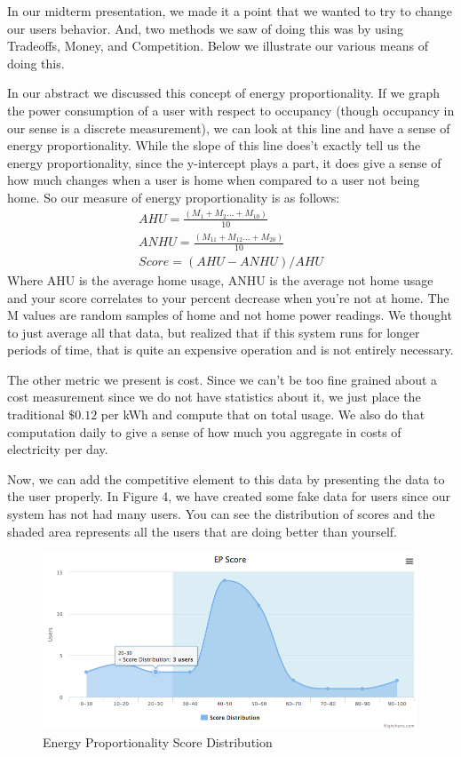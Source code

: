 \documentclass{sig-alternate-05-2015}
\begin{document}
In our midterm presentation, we made it a point that we wanted to try to change our users behavior. And, two methods we saw of doing this was by using Tradeoffs, Money, and Competition. Below we illustrate our various means of doing this.

In our abstract we discussed this concept of energy proportionality. If we graph the power consumption of a user with respect to occupancy (though occupancy in our sense is a discrete measurement), we can look at this line and have a sense of energy proportionality. While the slope of this line does't exactly tell us the energy proportionality, since the y-intercept plays a part, it does give a sense of how much changes when a user is home when compared to a user not being home. So our measure of energy proportionality is as follows:
\begin{equation*}
\begin{split}
AHU = \frac{(M_{1}+M_{2}...+M_{10})}{10}\\
ANHU = \frac{(M_{11}+M_{12}...+M_{20})}{10}\\
Score = (AHU-ANHU)/AHU
\end{split}
\end{equation*}
Where AHU is the average home usage, ANHU is the average not home usage and your score correlates to your percent decrease when you're not at home. The M values are random samples of home and not home power readings. We thought to just average all that data, but realized that if this system runs for longer periods of time, that is quite an expensive operation and is not entirely necessary.

The other metric we present is cost. Since we can't be too fine grained about a cost measurement since we do not have statistics about it, we just place the traditional $\$0.12$ per kWh and compute that on total usage. We also do that computation daily to give a sense of how much you aggregate in costs of electricity per day.

Now, we can add the competitive element to this data by presenting the data to the user properly. In Figure 4, we have created some fake data for users since our system has not had many users. You can see the distribution of scores and the shaded area represents all the users that are doing better than yourself.

\begin{figure}
	\centering
	\includegraphics[scale=.3]{dist}
	\caption{Energy Proportionality Score Distribution}
\end{figure}
\end{document}
